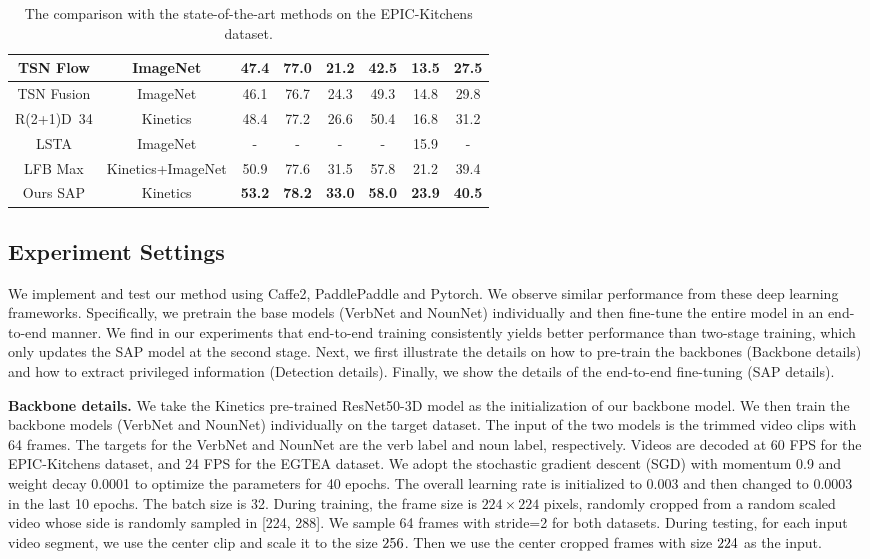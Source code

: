 \documentclass[letterpaper]{article} \usepackage{aaai20}  \usepackage{times}  \usepackage{helvet} \usepackage{courier}  \usepackage[hyphens]{url}  \usepackage{graphicx} \urlstyle{rm} \def\UrlFont{\rm}  \usepackage{graphicx}  \frenchspacing  \setlength{\pdfpagewidth}{8.5in}  \setlength{\pdfpageheight}{11in}  \usepackage{amsfonts,amssymb}
\begin{document}
\begin{table*}[t]
\begin{tabular}{|c|c|c|c|c|c|c|c|}
TSN Flow \cite{price2019evaluation}& ImageNet & 47.4 & 77.0 & 21.2 & 42.5 & 13.5 & 27.5 \\ \hline
TSN Fusion \cite{price2019evaluation} & ImageNet & 46.1 & 76.7 & 24.3 & 49.3 & 14.8 & 29.8 \\ \hline
R(2+1)D~34 \cite{Ghadiyaram_2019_CVPR}& Kinetics & 48.4 & 77.2 & 26.6 & 50.4 & 16.8 & 31.2 \\ \hline
LSTA \cite{Sudhakaran_2019_CVPR}& ImageNet & - & - & - & - & 15.9 & - \\ \hline
LFB Max \cite{Wu2018LongTermFB}& Kinetics+ImageNet & 50.9 & 77.6 & 31.5 & 57.8 & 21.2 & 39.4 \\ \hline
Ours SAP & Kinetics & \textbf{53.2} & \textbf{78.2} & \textbf{33.0} & \textbf{58.0} & \textbf{23.9} & \textbf{40.5} \\ \hline
\end{tabular}
\caption{The comparison with the state-of-the-art methods on the EPIC-Kitchens dataset.}  
\label{tab:epic_sota}
\end{table*}


\subsection{Experiment Settings}
 We implement and test our method using Caffe2, PaddlePaddle and Pytorch. We observe similar performance from these deep learning frameworks. 
Specifically, we pretrain the base models (VerbNet and NounNet) individually and then fine-tune the entire model in an end-to-end manner. We find in our experiments that end-to-end training consistently yields better performance than two-stage training, which only updates the SAP model at the second stage.
Next, we first illustrate the details on how to pre-train the backbones (Backbone details) and how to extract privileged information (Detection details). Finally, we show the details of the end-to-end fine-tuning (SAP details).

\textbf{Backbone details.} We take the Kinetics pre-trained ResNet50-3D model as the initialization of our backbone model.
We then train the backbone models (VerbNet and NounNet) individually on the target dataset.
The input of the two models is the trimmed video clips with 64 frames. The targets for the VerbNet and NounNet are the verb label and noun label, respectively.
Videos are decoded at 60 FPS for the EPIC-Kitchens dataset, and 24 FPS for the EGTEA dataset.
We adopt the stochastic gradient descent (SGD) with momentum 0.9
and weight decay 0.0001 to optimize the parameters for 40
epochs. The overall learning rate is initialized to 0.003 and then changed to 0.0003 in the last 10 epochs. The batch size is 32.
During training, the frame size is $224\times224$ pixels, randomly cropped from a random scaled video whose side is randomly sampled in [224, 288]. We sample 64 frames with stride=2 for both datasets.
During testing, for each input video segment, we use the center clip and scale it to the size $256\time 256$. Then we use the center cropped frames with size $224\time 224$ as the input.
\end{document}
